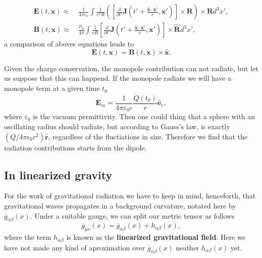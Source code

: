 \begin{align*}
\boldsymbol{E}(t,\boldsymbol{x})\approx & \ \frac{1}{4\pi\varepsilon_{0}}\int\frac{1}{c^{2}R}\left(\left[\frac{\partial}{\partial t'}\boldsymbol{J}\left(t'+\frac{\hat{\boldsymbol{x}}\cdot\boldsymbol{x}'}{c},\boldsymbol{x}'\right)\right]\times\boldsymbol{R}\right)\times\boldsymbol{R}d^{3}x',\\
\boldsymbol{B}(t,\boldsymbol{x})\approx & \ \frac{\mu_{0}}{4\pi}\int\frac{1}{cR}\left[\frac{\partial}{\partial t'}\boldsymbol{J}\left(t'+\frac{\hat{\boldsymbol{x}}\cdot\boldsymbol{x}'}{c},\boldsymbol{x}'\right)\right]\times\hat{\boldsymbol{R}}d^{3}x',
\end{align*}
a comparison of aboves equations leads to
\[
\boldsymbol{E}\left(t,\boldsymbol{x}\right)=\boldsymbol{B}\left(t,\boldsymbol{x}\right)\times\hat{\boldsymbol{x}}.
\]

Given the charge conservation, the monopole contribution can not radiate,
but let us suppose that this can happend. If the monopole radiate
we will have a monopole term at a given time $t_{0}$
\[
\boldsymbol{E}_{m}=\frac{1}{4\pi\varepsilon_{0}c}\frac{\dot{Q}(t_{0})}{r}\hat{\boldsymbol{e}}_{r},
\]
where $\varepsilon_{0}$ is the vacuum permittivity. Then one could
thing that a sphere with an oscillating radius should radiate, but
according to Gauss's law, is exactly $(Q/4\pi\epsilon_{0}r^{2})\hat{\boldsymbol{r}}$,
regardless of the fluctiations in size. Therefore we find that the
radiation contributions starts from the dipole.

\subsection{In linearized gravity}

For the work of gravitational radiation we have to keep in mind, henceforth,
that gravitational waves propagates in a background curvature, notated
here by $\overline{g}_{\alpha\beta}(x)$. Under a suitable gauge,
we can split our metric tensor as follows
\begin{equation}
g_{\mu\nu}(x)=\overline{g}_{\alpha\beta}(x)+h_{\alpha\beta}(x),\label{eq:ggh}
\end{equation}
where the term $h_{\alpha\beta}$ is known as the \textbf{linearized
gravitational field}. Here we have not made any kind of aproximation
over $\overline{g}_{\alpha\beta}(x)$ neather $h_{\alpha\beta}(x)$
yet.

